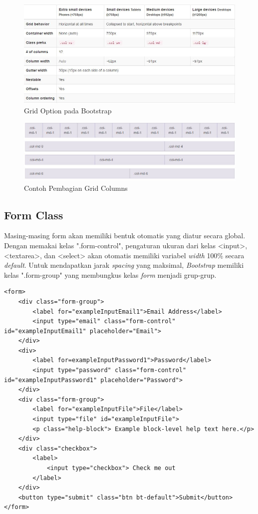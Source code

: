 \begin{figure}[H]
	\centering
	\includegraphics[scale=0.75]{Gambar/gridOption}
	\caption{Grid Option pada Bootstrap}
	\label{fig:gridOpt}
\end{figure}

\begin{figure}[H]
	\centering
	\includegraphics[scale=0.75]{Gambar/kolom}
	\caption{Contoh Pembagian Grid Columns}
	\label{fig:gridCol}
\end{figure}

\subsection{Form Class}
\label{sub: formClass}
	Masing-masing form akan memiliki bentuk otomatis yang diatur secara global. Dengan memakai kelas ".form-control", pengaturan ukuran dari kelas <input>, <textarea>, dan <select> akan otomatis memiliki variabel \textit{width} 100\% secara \textit{default}. Untuk mendapatkan jarak \textit{spacing} yang maksimal, \textit{Bootstrap} memiliki kelas ".form-group" yang membungkus kelas \textit{form} menjadi grup-grup.
	
\begin{lstlisting}
<form>
	<div class="form-group">
		<label for="exampleInputEmail1">Email Address</label>
		<input type="email" class="form-control" id="exampleInputEmail1" placeholder="Email">
	</div>
	<div>
		<label for=exampleInputPassword1">Password</label>
		<input type="password" class="form-control" id="exampleInputPassword1" placeholder="Password">
	</div>
	<div class="form-group">
		<label for="exampleInputFile">File</label>
		<input type="file" id="exampleInputFile">
		<p class="help-block"> Example block-level help text here.</p>
	</div>
	<div class="checkbox">
		<label>
			<input type="checkbox"> Check me out
		</label>
	</div>
	<button type="submit" class="btn bt-default">Submit</button>
</form>
\end{lstlisting}

